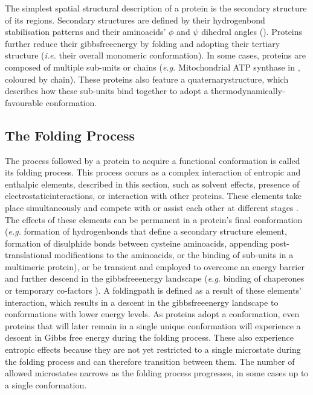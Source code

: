The simplest spatial structural description of a protein is the secondary structure of its regions. Secondary structures are defined by their \gls{hydrogenbond} stabilisation patterns and their \glspl{aminoacid}' $\phi$ and $\psi$ dihedral angles (). Proteins further reduce their \gls{gibbsfreeenergy} by folding and adopting their tertiary structure (\textit{i.e.} their overall monomeric \gls{conformation}). In some cases, proteins are composed of multiple sub-units or chains (\textit{e.g.} Mitochondrial ATP synthase in , coloured by chain). These proteins also feature a \gls{quaternarystructure}, which describes how these sub-units bind together to adopt a thermodynamically-favourable \gls{conformation}.

\subsection{The Folding Process}
The process followed by a protein to acquire a functional \gls{conformation} is called its folding process. This process occurs as a complex interaction of entropic and enthalpic elements, described in this section, such as solvent effects, presence of \gls{electrostaticinteractions}, or interaction with other proteins. These elements take place simultaneously and compete with or assist each other at different stages \cite{onuchic_theory_2004}. The effects of these elements can be permanent in a protein's final \gls{conformation} (\textit{e.g.} formation of \glspl{hydrogenbond} that define a secondary structure element, formation of disulphide bonds between cysteine \glspl{aminoacid}, appending post-translational modifications to the \glspl{aminoacid}, or the binding of sub-units in a multimeric protein), or be transient and employed to overcome an energy barrier and further descend in the \gls{gibbsfreeenergy} landscape (\textit{e.g.} binding of chaperones \cite{dandage_classification_2015, balchin_recent_2020, lu_energy_2021} or temporary co-factors \cite{wittung-stafshede_role_2002, wilson_role_2004, bushmarina_cofactor_2006}). A \gls{foldingpath} is defined as a result of these elements' interaction, which results in a descent in the \gls{gibbsfreeenergy} landscape to \glspl{conformation} with lower energy levels. As proteins adopt a conformation, even proteins that will later remain in a single unique conformation will experience a descent in Gibbs free energy during the folding process. These also experience entropic effects because they are not yet restricted to a single microstate during the folding process and can therefore transition between them. The number of allowed microstates narrows as the folding process progresses, in some cases up to a single conformation.


